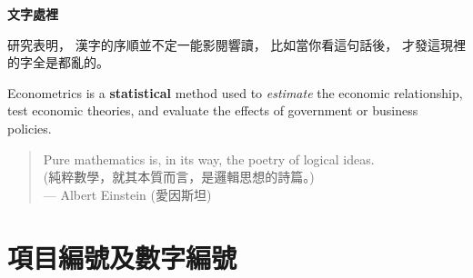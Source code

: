 \documentclass[12pt, aspectratio=169]{beamer}
\begin{document}

\linespread{1}  %
\begin{frame}{\textbf{文字處裡}}
\linespread{1.5} %

	研究表明，
	漢字的序順並不定一能影閱響讀，
	比如當你看這句話後，
	才發這現裡的字全是都亂的。
	
	 \bigskip 
	 
	\pause 
	
	 \alert{Econometrics} is a \textbf{statistical} method used to \textit{estimate} the economic relationship,
	 test economic theories, and evaluate the effects of government or business policies.
	 
	 \pause
	
	\bigskip 

	\begin{quote}
		Pure mathematics is, in its way, the poetry of logical ideas.\\
		(純粹數學，就其本質而言，是邏輯思想的詩篇。)\\
		--- Albert Einstein (愛因斯坦)
	\end{quote}
	
\end{frame}


\section{項目編號及數字編號}

\end{document}
